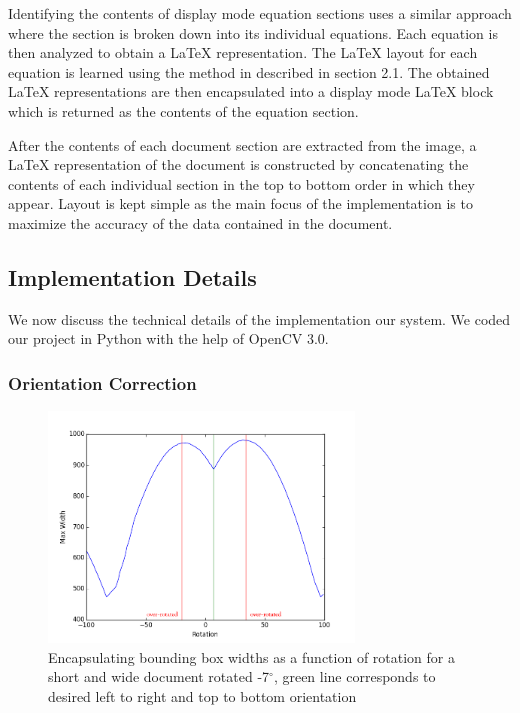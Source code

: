 \documentclass[10pt]{IEEEtran}
\newcommand{\latex}{\LaTeX\xspace}
\begin{document}
Identifying the contents of display mode equation sections uses a similar approach where the section is broken down  into its individual equations. Each equation is then analyzed to obtain a \latex representation. The \latex layout for each equation is learned using the method in \cite{4} described in section 2.1. The obtained \latex representations are then encapsulated into a display mode \latex block which is returned as the contents of the equation section.

After the contents of each document section are extracted from the image, a \latex representation of the document is constructed by concatenating the contents of each individual section in the top to bottom order in which they appear. Layout is kept simple as the main focus of the implementation is to maximize the accuracy of the data contained in the document.

\subsection{Implementation Details}

We now discuss the technical details of the implementation our system. We coded our project in Python with the help of OpenCV 3.0.

\subsubsection{Orientation Correction}

\begin{figure}[h]
  \centering
    \includegraphics[width=3.2in]{rotationPlot.png}
  \caption{Encapsulating bounding box widths as a function of rotation for a short and wide document rotated -7$^\circ$, green line corresponds to desired left to right and top to bottom orientation}
  \label{fig:rotations}
\end{figure}
\end{document}
